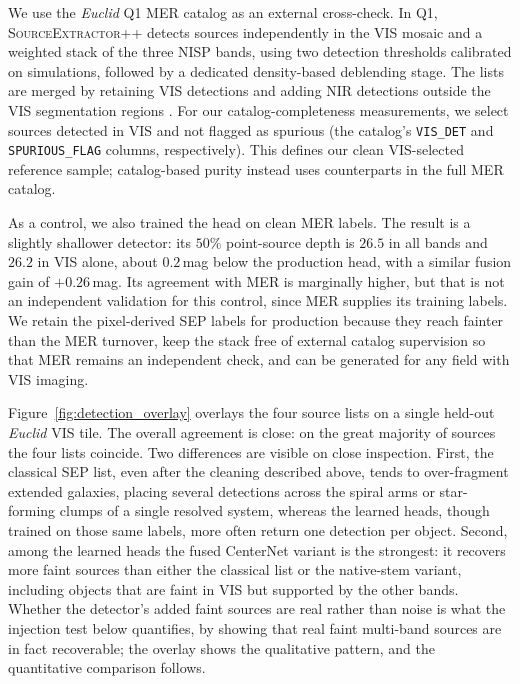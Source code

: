 \documentclass[twocolumn,linenumbers]{aastex701}
\begin{document}
We use the \textit{Euclid} Q1 MER catalog \citep{IRSA602} as an external cross-check. In Q1, \textsc{SourceExtractor++} detects sources independently in the VIS mosaic and a weighted stack of the three NISP bands, using two detection thresholds calibrated on simulations, followed by a dedicated density-based deblending stage. The lists are merged by retaining VIS detections and adding NIR detections outside the VIS segmentation regions \citep{MER}. For our catalog-completeness measurements, we select sources detected in VIS and not flagged as spurious (the catalog's \texttt{VIS\_DET} and \texttt{SPURIOUS\_FLAG} columns, respectively). This defines our clean VIS-selected reference sample; catalog-based purity instead uses counterparts in the full MER catalog.

As a control, we also trained the head on clean MER labels. The result is a slightly shallower detector: its $50\%$ point-source depth is $26.5$ in all bands and $26.2$ in VIS alone, about $0.2$\,mag below the production head, with a similar fusion gain of $+0.26$\,mag. Its agreement with MER is marginally higher, but that is not an independent validation for this control, since MER supplies its training labels. We retain the pixel-derived \textsc{SEP} labels for production because they reach fainter than the MER turnover, keep the stack free of external catalog supervision so that MER remains an independent check, and can be generated for any field with VIS imaging.

Figure~\ref{fig:detection_overlay} overlays the four source lists on a single held-out \textit{Euclid} VIS tile. The overall agreement is close: on the great majority of sources the four lists coincide. Two differences are visible on close inspection. First, the classical \textsc{SEP} list, even after the cleaning described above, tends to over-fragment extended galaxies, placing several detections across the spiral arms or star-forming clumps of a single resolved system, whereas the learned heads, though trained on those same labels, more often return one detection per object. Second, among the learned heads the fused CenterNet variant is the strongest: it recovers more faint sources than either the classical list or the native-stem variant, including objects that are faint in VIS but supported by the other bands. Whether the detector's added faint sources are real rather than noise is what the injection test below quantifies, by showing that real faint multi-band sources are in fact recoverable; the overlay shows the qualitative pattern, and the quantitative comparison follows.
\end{document}
